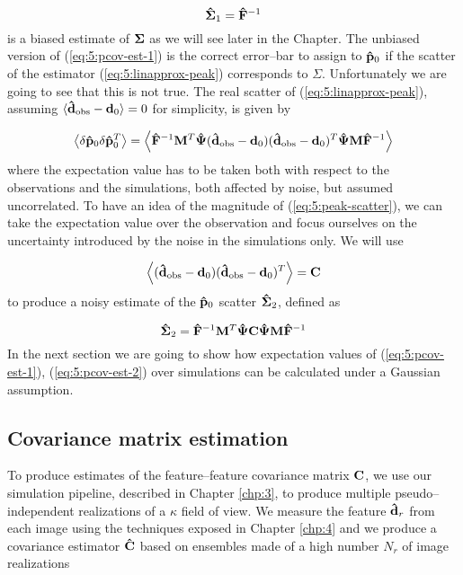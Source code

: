 \begin{equation}
\label{eq:5:pcov-est-1}
\mathbf{\hat{\Sigma}}_1 = \mathbf{\hat{F}}^{-1}
\end{equation}
%
is a biased estimate of $\mathbf{\Sigma}$ as we will see later in the Chapter. The unbiased version of (\ref{eq:5:pcov-est-1}) is the correct error--bar to assign to $\mathbf{\hat{p}}_0$ if the scatter of the estimator (\ref{eq:5:linapprox-peak}) corresponds to $\Sigma$. Unfortunately we are going to see that this is not true. The real scatter of (\ref{eq:5:linapprox-peak}), assuming $\langle\mathbf{\hat{d}}_{\rm obs}-\mathbf{d}_0\rangle=0$ for simplicity, is given by

\begin{equation}
\label{eq:5:peak-scatter}
\left\langle\delta\mathbf{\hat{p}}_0\delta\mathbf{\hat{p}}_0^T\right\rangle = \left\langle\mathbf{\hat{F}}^{-1}\mathbf{M}^T\mathbf{\hat{\Psi}}(\mathbf{\hat{d}}_{\rm obs}-\mathbf{d}_0)(\mathbf{\hat{d}}_{\rm obs}-\mathbf{d}_0)^T\mathbf{\hat{\Psi}}\mathbf{M}\mathbf{\hat{F}}^{-1}\right\rangle
\end{equation}
%
where the expectation value has to be taken both with respect to the observations and the simulations, both affected by noise, but assumed uncorrelated. To have an idea of the magnitude of (\ref{eq:5:peak-scatter}), we can take the expectation value over the observation and focus ourselves on the uncertainty introduced by the noise in the simulations only. We will use 

\begin{equation}
\label{eq:5:expobs}
\left\langle(\mathbf{\hat{d}}_{\rm obs}-\mathbf{d}_0)(\mathbf{\hat{d}}_{\rm obs}-\mathbf{d}_0)^T\right\rangle = \mathbf{C}
\end{equation}
%
to produce a noisy estimate of the $\mathbf{\hat{p}}_0$ scatter $\mathbf{\hat{\Sigma}}_2$, defined as 

\begin{equation}
\label{eq:5:pcov-est-2}
\mathbf{\hat{\Sigma}}_2 = \mathbf{\hat{F}}^{-1}\mathbf{M}^T\mathbf{\hat{\Psi}}\mathbf{C}\mathbf{\hat{\Psi}}\mathbf{M}\mathbf{\hat{F}}^{-1} 
\end{equation} 
%
In the next section we are going to show how expectation values of (\ref{eq:5:pcov-est-1}), (\ref{eq:5:pcov-est-2}) over simulations can be calculated under a Gaussian assumption.    

\subsection{Covariance matrix estimation}
To produce estimates of the feature--feature covariance matrix $\mathbf{C}$, we use our simulation pipeline, described in Chapter \ref{chp:3}, to produce multiple pseudo--independent realizations of a $\kappa$ field of view. We measure the feature $\mathbf{\hat{d}}_r$ from each image using the techniques exposed in Chapter \ref{chp:4} and we produce a covariance estimator $\mathbf{\hat{C}}$ based on ensembles made of a high number $N_r$ of image realizations


